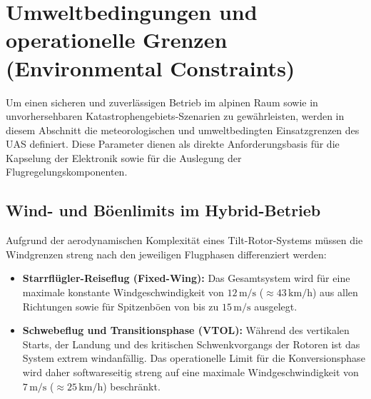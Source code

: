 
\section{Umweltbedingungen und operationelle Grenzen (Environmental Constraints)}
\label{sec:environmental_constraints}

Um einen sicheren und zuverlässigen Betrieb im alpinen Raum sowie in unvorhersehbaren Katastrophengebiets-Szenarien zu gewährleisten, 
werden in diesem Abschnitt die meteorologischen und umweltbedingten Einsatzgrenzen des UAS definiert. Diese Parameter dienen als direkte Anforderungsbasis für die Kapselung der Elektronik sowie für die Auslegung der Flugregelungskomponenten.

\subsection{Wind- und Böenlimits im Hybrid-Betrieb}
Aufgrund der aerodynamischen Komplexität eines Tilt-Rotor-Systems müssen die Windgrenzen streng nach den jeweiligen Flugphasen differenziert werden:
\begin{itemize}
    \item \textbf{Starrflügler-Reiseflug (Fixed-Wing):} Das Gesamtsystem wird für eine maximale konstante Windgeschwindigkeit von $12\,\text{m/s}$ ($\approx 43\,\text{km/h}$) aus allen Richtungen sowie für Spitzenböen von bis zu $15\,\text{m/s}$ ausgelegt.
    \item \textbf{Schwebeflug und Transitionsphase (VTOL):} Während des vertikalen Starts, der Landung und des kritischen Schwenkvorgangs der Rotoren ist das System extrem windanfällig. 
    Das operationelle Limit für die Konversionsphase wird daher softwareseitig streng auf eine maximale Windgeschwindigkeit von $7\,\text{m/s}$ ($\approx 25\,\text{km/h}$) beschränkt.
\end{itemize}

